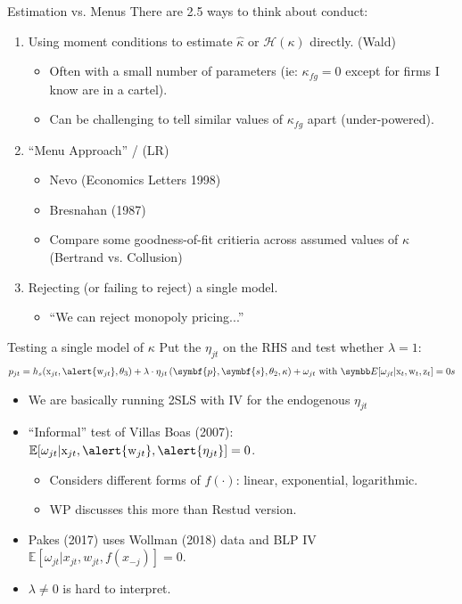 \documentclass[aspectratio=169,10pt]{beamer}
\begin{document}
\begin{frame}{Estimation vs. Menus}
There are 2.5 ways to think about conduct:
\begin{enumerate}
\item Using moment conditions to estimate $\widehat{\kappa}$ or $\mathcal{H}(\kappa)$ directly. (Wald)
\begin{itemize}
\item Often with a small number of parameters (ie: $\kappa_{fg}=0$ except for firms I know are in a cartel).
\item Can be challenging to tell similar values of $\kappa_{fg}$ apart (under-powered).
\end{itemize}
\item ``Menu Approach'' / (LR)
\begin{itemize}
\item  Nevo (Economics Letters 1998)
\item Bresnahan (1987)
\item Compare some goodness-of-fit critieria across assumed values of $\kappa$ (Bertrand vs. Collusion)
  \end{itemize}
\item Rejecting (or failing to reject) a single model.
\begin{itemize}
  \item ``We can reject monopoly pricing...''
\end{itemize}
  \end{enumerate}
\end{frame}


\begin{frame}{Testing a single model of $\kappa$}
Put the $\eta_{jt}$ on the RHS and test whether $\lambda=1$:
\begin{align*}
 p_{jt} = h_s(\textrm{x}_{jt}, \alert{\textrm{w}_{jt}},\theta_3) + \lambda \cdot \eta_{jt}\left(\symbf{p},\symbf{s},\theta_2,\kappa \right)+  \omega_{jt} \text{ with }
 \E[\omega_{jt} | \textrm{x}_{t},\textrm{w}_{t},\textrm{z}_{t}]=0s
\end{align*}
\vspace{-0.25cm}
\begin{itemize}
\item We are basically running 2SLS with IV for the endogenous $\eta_{jt}$
\item ``Informal'' test of Villas Boas (2007): $\mathbb{E}[\omega_{jt} | \textrm{x}_{jt},\alert{\textrm{w}_{jt}},\alert{\eta_{jt}}]=0$.
\begin{itemize}
\item Considers different forms of $f(\cdot)$: linear, exponential, logarithmic.
\item WP discusses this more than Restud version.
  \end{itemize}
\item Pakes (2017) uses Wollman (2018) data and BLP IV $\mathbb{E}[\omega_{jt} | x_{jt},w_{jt},f(x_{-j})]=0$.
\item $\lambda \neq 0$ is hard to interpret.
\end{itemize}
\end{frame}
\end{document}

